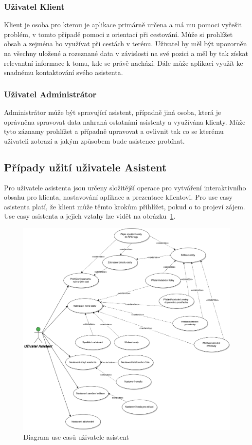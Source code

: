\documentclass[czech,master,public,dept460,male,java,cpdeclaration]{diploma}
\begin{document}
\subsubsection{Uživatel Klient}
Klient je osoba pro kterou je aplikace primárně určena a má mu pomoci vyřešit problém,
v tomto případě pomoci z orientací při cestování. Může si prohlížet obsah a zejména ho
využívat při cestách v terénu. Uživatel by měl být upozorněn na všechny uložené a rozeznané
data v závislosti na své pozici a měl by tak získat relevantní informace k tomu, kde se právě
nachází. Dále může aplikaci využít ke snadnému kontaktování svého asistenta.


\subsubsection{Uživatel Administrátor}
Administrátor může být spravující asistent, případně jiná osoba, která je oprávněna spravovat
data nahraná ostatními asistenty a využívána klienty. Může tyto záznamy prohlížet a případně
 upravovat a ovlivnit tak co se kterému uživateli zobrazí a jakým způsobem bude asistence probíhat.


\subsection{Případy užití uživatele Asistent}
Pro uživatele asistenta jsou určeny složitější operace pro vytváření interaktivního obsahu pro klienta,
nastavování aplikace a prezentace klientovi. Pro use casy asistenta platí, že klient může těmto
krokům přihlížet, pokud o to projeví zájem. Use casy asistenta a jejich vztahy lze vidět na obrázku~\ref{fig:UseCasesAsistant}.

\begin{figure}[H]
        \centering
                \includegraphics[scale=0.2]{img/UseCasesAsistant.png}
        \caption{Diagram use casů uživatele asistent}
        \label{fig:UseCasesAsistant}
\end{figure}
\end{document}
